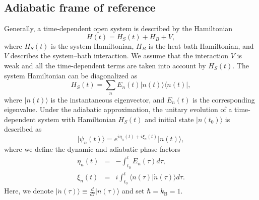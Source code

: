 \documentclass[english,nofootinbib, pra, twocolumn,superscriptaddress]{revtex4-1}
\begin{document}
\subsection{Adiabatic frame of reference}

Generally, a time-dependent open system is described by the Hamiltonian
\begin{equation}
H(t)=H_{S}(t)+H_{B}+V,\label{eq:Ht}
\end{equation}
where $H_{S}(t)$ is the system Hamiltonian, $H_{B}$ is the heat bath Hamiltonian, and $V$ describes the system--bath interaction. We assume that the interaction $V$ is weak and all the time-dependent terms are taken
into account by $H_{S}(t)$. The system Hamiltonian can be diagonalized
as
\begin{equation}
H_{S}(t)=\sum_{n}E_{n}(t)\vert n(t)\rangle\langle n(t)\vert,\label{eq:Hst}
\end{equation}
where $\vert n(t)\rangle$ is the instantaneous eigenvector, and $E_{n}(t)$ is 
the corresponding eigenvalue. Under the adiabatic approximation, the
unitary evolution of a time-dependent system with Hamiltonian $H_{S}(t)$ and initial state $\vert n(t_{0})\rangle$ is described as
\begin{equation}
\vert\psi_{n}(t)\rangle=e^{i\eta_{n}(t)+i\xi_{n}(t)}\vert n(t)\rangle,\label{eq:IES}
\end{equation}
where we define the dynamic and adiabatic phase factors 
\begin{eqnarray}
\eta_{n}(t) & = & -\int_{t_{0}}^{t}E_{n}(\tau)d\tau,\label{eq:DF}\\
\xi_{n}(t) & = & i\int_{t_{0}}^{t}\langle n(\tau)\vert\dot{n}(\tau)\rangle d\tau.\label{eq:BF}
\end{eqnarray}
Here, we denote $\vert\dot{n}(\tau)\rangle\equiv\frac{d}{d\tau}\vert n(\tau)\rangle$ and set $\hbar=k_{\mathrm{B}}=1$.
\end{document}
